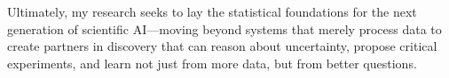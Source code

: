 Ultimately, my research seeks to lay the statistical foundations for the next generation of scientific AI—moving beyond systems that merely process data to create partners in discovery that can reason about uncertainty, propose critical experiments, and learn not just from more data, but from better questions.